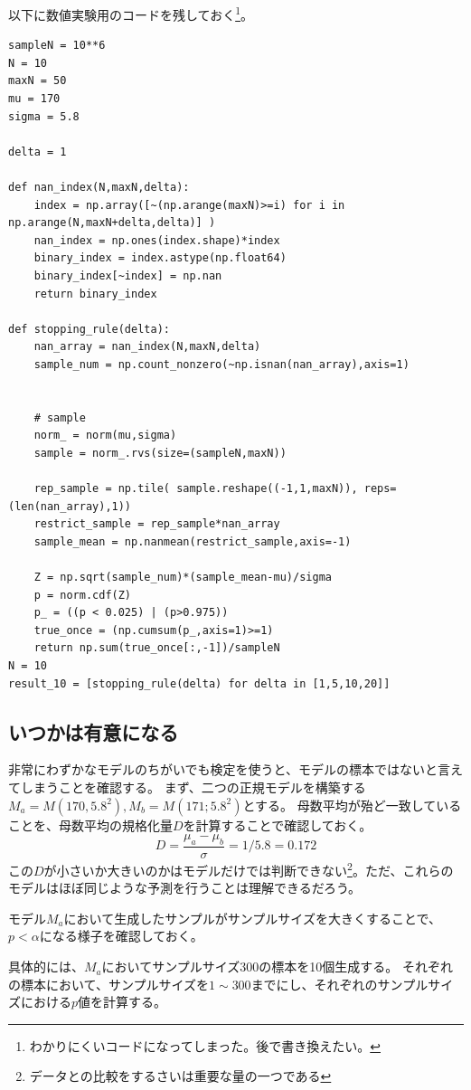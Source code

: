 以下に数値実験用のコードを残しておく\footnote{わかりにくいコードになってしまった。後で書き換えたい。}。
\begin{lstlisting}
sampleN = 10**6
N = 10
maxN = 50
mu = 170
sigma = 5.8

delta = 1

def nan_index(N,maxN,delta):
    index = np.array([~(np.arange(maxN)>=i) for i in np.arange(N,maxN+delta,delta)] )
    nan_index = np.ones(index.shape)*index
    binary_index = index.astype(np.float64)
    binary_index[~index] = np.nan
    return binary_index

def stopping_rule(delta):
    nan_array = nan_index(N,maxN,delta)
    sample_num = np.count_nonzero(~np.isnan(nan_array),axis=1)


    # sample
    norm_ = norm(mu,sigma)
    sample = norm_.rvs(size=(sampleN,maxN))

    rep_sample = np.tile( sample.reshape((-1,1,maxN)), reps= (len(nan_array),1))
    restrict_sample = rep_sample*nan_array
    sample_mean = np.nanmean(restrict_sample,axis=-1)

    Z = np.sqrt(sample_num)*(sample_mean-mu)/sigma
    p = norm.cdf(Z)
    p_ = ((p < 0.025) | (p>0.975))
    true_once = (np.cumsum(p_,axis=1)>=1)
    return np.sum(true_once[:,-1])/sampleN
N = 10
result_10 = [stopping_rule(delta) for delta in [1,5,10,20]]
\end{lstlisting}

\subsection{いつかは有意になる}
非常にわずかなモデルのちがいでも検定を使うと、モデルの標本ではないと言えてしまうことを確認する。
まず、二つの正規モデルを構築する$M_a=M(170,5.8^2),M_b=M(171;5.8^2)$とする。
母数平均が殆ど一致していることを、母数平均の規格化量$D$を計算することで確認しておく。
\begin{equation*}
 D=\frac{\mu_a-\mu_b}{\sigma} = 1/5.8=0.172
\end{equation*}
この$D$が小さいか大きいのかはモデルだけでは判断できない\footnote{データとの比較をするさいは重要な量の一つである}。ただ、これらのモデルはほぼ同じような予測を行うことは理解できるだろう。

モデル$M_a$において生成したサンプルがサンプルサイズを大きくすることで、$p<\alpha$になる様子を確認しておく。

具体的には、$M_a$においてサンプルサイズ$300$の標本を10個生成する。
それぞれの標本において、サンプルサイズを$1\sim 300$までにし、それぞれのサンプルサイズにおける$p$値を計算する。

